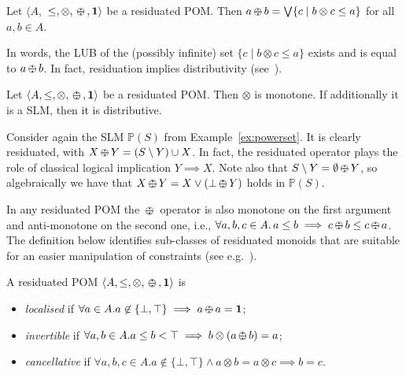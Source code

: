 \documentclass{llncs}
\def\1{{\mathbf 1}}
\def\monid{{\mathbf 0}}
\def\1{{\mathbf 1}}
\def\monop{\otimes}
\def\odiv{\, {\ominus\hspace{-7.7pt} \div} \,}
\def\monid{\mathbf{1}}
\begin{document}
\begin{lemma}\label{rclm1}
	Let $\langle A,$ $\leq, \otimes,  \odiv, \1 \rangle$ be a residuated POM.
	Then $a \odiv b = \bigvee \{c \mid b \otimes c \leq a\}$ for all $a, b \in A$.
\end{lemma}

In words, the LUB of the (possibly infinite) set 
$\{c \mid b \otimes c \leq a\}$ exists and is equal to $a \odiv b$.
%
In fact, residuation implies distributivity (see~\cite[Lemma 2.2]{ipl17}).

\begin{lemma}\label{rclm2}
	Let $\langle A, \leq, \monop, \odiv, \1 \rangle$ be a residuated POM. 
	Then $\monop$ is monotone.
	If additionally it is a SLM, then it is distributive.
\end{lemma}

\begin{example}
Consider again the SLM $\mathbb{P}(S)$ from Example~\ref{ex:powerset}. 
It is clearly residuated, with $X \odiv Y = (S \setminus Y) \cup X$. In fact, the 
residuated operator plays the role of classical logical implication $Y \implies X$.
Note also that $S \setminus Y = \emptyset \odiv Y$, so algebraically we have 
that $X \odiv Y = X \vee (\bot \odiv Y)$ holds in $\mathbb{P}(S)$.
\end{example}

In any residuated POM the $\odiv$ operator is also monotone on the first argument and 
anti-monotone on the second one, i.e., 
$\forall a, b, c \in A.\, a\leq b \implies  c\odiv b \leq c \odiv a$.
%
The definition below identifies sub-classes 
of residuated monoids that are suitable for an easier manipulation
of constraints (see e.g.~\cite{ecai06}).

\begin{definition}
	A residuated POM $\langle A, \leq, \monop, \odiv, \monid \rangle$ is
	\begin{itemize}
		\item
		\emph{localised} if $\forall a \in A. a \not \in \{\bot,\top\} \implies a \odiv a = \1$;
		\item
		\emph{invertible} if $\forall a, b \in A. a \leq b < \top \implies b \monop (a \odiv b) = a$;
		\item
		\emph{cancellative} if $\forall a, b, c \in A. a \not \in \{\bot,\top\} \wedge a \otimes b = a  \otimes c \implies b = c$.
	\end{itemize}
\end{definition}
\end{document}
